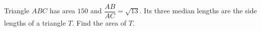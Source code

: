 Triangle $ABC$ has area $150$ and $\dfrac{AB}{AC}=\sqrt{13}$. Its three median lengths are the side lengths of a triangle $T$. Find the area of $T$.
